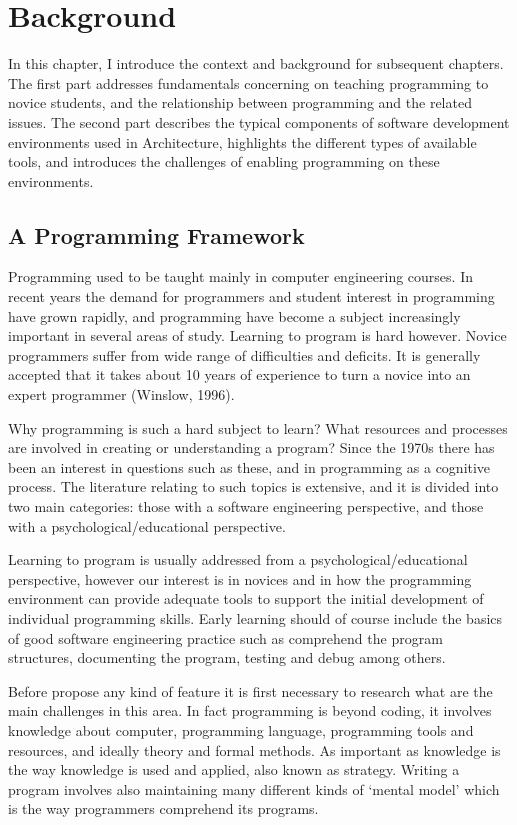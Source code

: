 
\chapter{Background}
\label{chapter:generativeDesign}

In this chapter, I introduce the context and background for subsequent chapters. The first part addresses fundamentals concerning on teaching programming to novice students, and the relationship between programming and the related issues. The second part describes the typical components of software development environments used in Architecture, highlights the different types of available tools, and introduces the challenges of enabling programming on these environments.

\section{A Programming Framework}

Programming used to be taught mainly in computer engineering courses. In recent years the demand for programmers and student interest in programming have grown rapidly, and programming have become a subject increasingly important in several areas of study. Learning to program is hard however. Novice programmers suffer from wide range of difficulties and deficits. It is generally accepted that it takes about 10 years of experience to turn a novice into an expert programmer (Winslow, 1996).

Why programming is such a hard subject to learn? What resources and
processes are involved in creating or understanding a program? Since the 1970s there has been an interest in questions such as these, and in programming as a cognitive process. The literature relating to such topics is extensive, and it is divided into two main categories: those with a software engineering perspective, and those with a psychological/educational perspective.

Learning to program is usually addressed from a psychological/educational perspective, however our interest is in novices and in how the programming environment can provide adequate tools to support the initial development of individual programming skills. Early learning should of course include the basics of good software engineering practice such as comprehend the program structures, documenting the program, testing and debug among others.

Before propose any kind of feature it is first necessary to research what are the main challenges in this area. In fact programming is beyond coding, it involves knowledge about computer, programming language, programming tools and resources, and ideally theory and formal methods. As important as knowledge is the way knowledge is used and applied, also known as strategy. Writing a program involves also maintaining many different kinds of ‘mental model’ which is the way programmers comprehend its programs.

